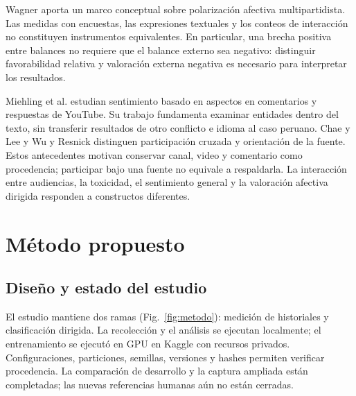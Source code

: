 \documentclass[conference,letterpaper]{IEEEtran}
\begin{document}
Wagner \cite{wagner2021affective} aporta un marco conceptual sobre polarización afectiva multipartidista. Las medidas con encuestas, las expresiones textuales y los conteos de interacción no constituyen instrumentos equivalentes. En particular, una brecha positiva entre balances no requiere que el balance externo sea negativo: distinguir favorabilidad relativa y valoración externa negativa es necesario para interpretar los resultados.

Miehling et al. \cite{Miehling2025} estudian sentimiento basado en aspectos en comentarios y respuestas de YouTube. Su trabajo fundamenta examinar entidades dentro del texto, sin transferir resultados de otro conflicto e idioma al caso peruano. Chae y Lee \cite{Chae2024} y Wu y Resnick \cite{Wu2021} distinguen participación cruzada y orientación de la fuente. Estos antecedentes motivan conservar canal, video y comentario como procedencia; participar bajo una fuente no equivale a respaldarla. La interacción entre audiencias, la toxicidad, el sentimiento general y la valoración afectiva dirigida responden a constructos diferentes.

\section{Método propuesto}
\subsection{Diseño y estado del estudio}
El estudio mantiene dos ramas (Fig.~\ref{fig:metodo}): medición de historiales y clasificación dirigida. La recolección y el análisis se ejecutan localmente; el entrenamiento se ejecutó en GPU en Kaggle con recursos privados. Configuraciones, particiones, semillas, versiones y hashes permiten verificar procedencia. La comparación de desarrollo y la captura ampliada están completadas; las nuevas referencias humanas aún no están cerradas.
\end{document}
